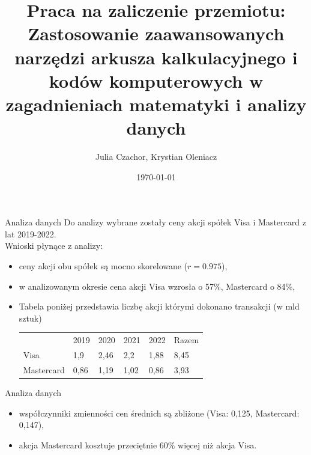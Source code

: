 \documentclass{beamer}
\title{Praca na zaliczenie przemiotu: Zastosowanie zaawansowanych narzędzi arkusza kalkulacyjnego i kodów komputerowych w zagadnieniach matematyki i analizy danych}
\date{\today}
\author{Julia Czachor, Krystian Oleniacz}
\begin{document}
  \maketitle
  \begin{frame}{Analiza danych}
    Do analizy wybrane zostały ceny akcji spółek Visa i Mastercard z lat 2019-2022. \\
    Wnioski płynące z analizy:
    \begin{itemize}
      \item ceny akcji obu spółek są mocno skorelowane ($r  = 0.975$),
      \item w analizowanym okresie cena akcji Visa wzrosła o 57\%, Mastercard o 84\%,
      \item Tabela poniżej przedstawia liczbę akcji którymi dokonano transakcji (w mld sztuk)
      \begin{table}[]
        \begin{tabular}{llllll}
                   & 2019 & 2020 & 2021 & 2022 & Razem \\
        Visa       & 1,9  & 2,46 & 2,2  & 1,88 & 8,45  \\
        Mastercard & 0,86 & 1,19 & 1,02 & 0,86 & 3,93 
        \end{tabular}
        \end{table}
    \end{itemize}
  \end{frame}

\begin{frame}{Analiza danych}
  \begin{itemize}
    \item współczynniki zmienności cen średnich są zbliżone (Visa:  0,125, Mastercard: 0,147),
    \item akcja Mastercard kosztuje przeciętnie 60\% więcej niż akcja Visa.
  \end{itemize}
\end{frame}
\end{document}
